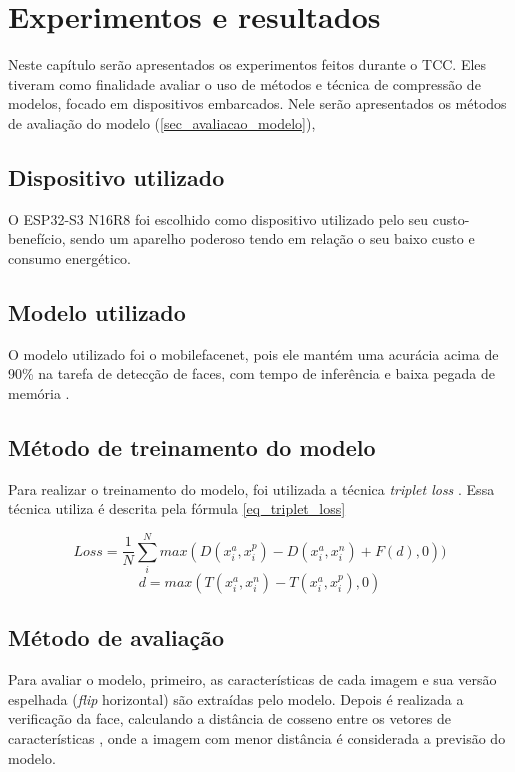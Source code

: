 \chapter{Experimentos e resultados}

Neste capítulo serão apresentados os experimentos feitos durante o TCC. Eles tiveram como
finalidade avaliar o uso de métodos e técnica de compressão de modelos, focado em dispositivos
embarcados. Nele serão apresentados os métodos de avaliação do modelo (\autoref{sec_avaliacao_modelo}),

\section{Dispositivo utilizado}\label{sec_dispositivo}
O ESP32-S3 N16R8 foi escolhido como dispositivo utilizado pelo seu custo-benefício,
sendo um aparelho poderoso tendo em relação o seu baixo custo e consumo energético.

\section{Modelo utilizado}\label{sec_modelo_utilizado}
O modelo utilizado foi o mobilefacenet, pois ele mantém uma acurácia acima de 90\% na tarefa de detecção de faces,
com tempo de inferência e baixa pegada de memória \cite{leandro}.

\section{Método de treinamento do modelo}\label{sec_treinamento_modelo}
Para realizar o treinamento do modelo, foi utilizada a técnica \textit{triplet loss}
\cite{triplet_distillation_face_recognition}. Essa técnica utiliza é descrita pela fórmula \ref{eq_triplet_loss}


\begin{equation}\label{eq_triplet_loss}
	Loss = \frac 1 N \sum _i ^N max(D(x_i^a, x_i^p) - D(x_i^a, x_i^n) + F(d), 0))
\end{equation}
\begin{equation}\label{eq_triplet_loss_teacher_dist}
	d = max(T(x_i^a, x_i^n) - T(x_i^a, x_i^p), 0)
\end{equation}


\section{Método de avaliação}\label{sec_avaliacao_modelo}
Para avaliar o modelo, primeiro, as características de cada imagem e sua versão espelhada
(\textit{flip} horizontal) são extraídas pelo modelo. Depois é realizada a verificação da face,
calculando a distância de cosseno entre os vetores de características \cite{triplet_distillation_face_recognition}, onde a imagem com menor distância é considerada a previsão do modelo.

